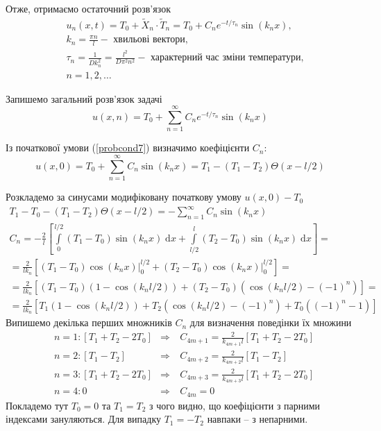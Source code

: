 Отже, отримаємо остаточний розв'язок
\begin{equation}
    \begin{aligned}
        \;&u_n(x,t) = T_0 + \widetilde{X}_n \cdot \widetilde{T}_n = T_0 + C_n e^{-t/\tau_n} \sin(k_n x),\\
        &k_n = \frac{\pi n}{l} - \text{ хвильові вектори}, \\
        &\tau_n = \frac{1}{D k_n^2} = \frac{l^2}{D \pi^2 n^2} - \text{ характерний час зміни температури}, \\
        &n = 1, 2,\ldots
    \end{aligned}
\end{equation}

Запишемо загальний розв'язок задачі
\begin{equation}
    u(x,n) = T_0 + \sum_{n=1}^{\infty}C_n e^{-t/\tau_n} \sin(k_n x)
\end{equation}

Із початкової умови (\ref{probcond7}) визначимо коефіцієнти $C_n$:
\begin{equation}
    u(x,0) = T_0 + \sum_{n=1}^{\infty}C_n \sin(k_n x) =  T_1 - (T_1 - T_2)\Theta(x - l/2)
\end{equation}

Розкладемо за синусами модифіковану початкову умову $u(x,0) - T_0$ 
\begin{equation*}
    \begin{gathered}
        T_1 - T_0 - (T_1 - T_2)\Theta(x - l/2) = - \sum_{n=1}^{\infty}C_n \sin(k_n x)\\
        C_n = -\frac{2}{l}\left[\int\limits_0^{l/2} (T_1 - T_0)\sin(k_n x) \;\mathrm{d}x + \int\limits_{l/2}^l (T_2 - T_0)\sin(k_n x) \;\mathrm{d}x\right] =\\
        = \frac{2}{lk_n}\left[(T_1 - T_0)\cos(k_n x)\biggr\rvert_0^{l/2} + (T_2 - T_0)\cos(k_n x)\biggr\rvert_0^{l/2}\right] =\\
        = \frac{2}{lk_n}\left[(T_1 - T_0)(1 - \cos(k_n l/2)) + (T_2 - T_0)(\cos(k_n l/2) - (-1)^n)\right] =\\
        = \frac{2}{lk_n}\left[T_1(1 - \cos(k_n l/2)) + T_2(\cos(k_n l/2) - (-1)^n) + T_0 ((-1)^n - 1)\right]
    \end{gathered}
\end{equation*}
Випишемо декілька перших множників $C_n$ для визначення поведінки їх множини
\begin{equation*}
    \begin{aligned}
        &n=1: \left[T_1 + T_2 - 2T_0 \right] &\Rightarrow&\ C_{4m+1} = \frac{2}{k_{4m+1}l}\left[T_1 + T_2 - 2T_0 \right]\\
        &n=2: \left[T_1 - T_2 \right] &\Rightarrow&\ C_{4m+2} = \frac{2}{k_{4m+2}l}\left[T_1 - T_2 \right]\\
        &n=3: \left[T_1 + T_2 - 2T_0 \right] &\Rightarrow&\ C_{4m+3} = \frac{2}{k_{4m+3}l}\left[T_1 + T_2 - 2T_0 \right]\\
        &n=4: 0 &\Rightarrow&\ C_{4m} = 0
    \end{aligned}    
\end{equation*}
Покладемо тут $T_0 = 0$ та $T_1 = T_2$ з чого видно, що коефіцієнти з парними індексами зануляються. Для випадку $T_1 = -T_2$ навпаки -- з непарними.

